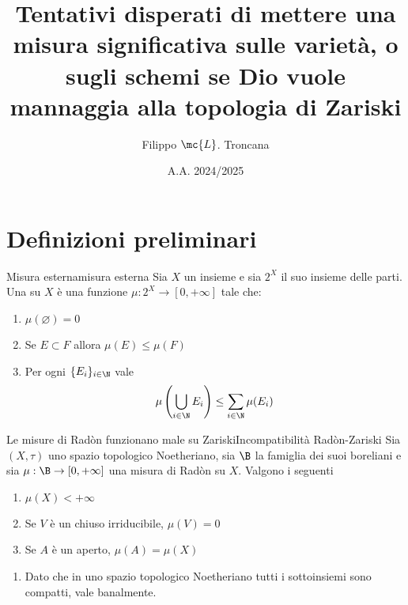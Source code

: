 \documentclass{article}
\title{Tentativi disperati di mettere una misura significativa sulle varietà, o sugli schemi se Dio vuole mannaggia alla topologia di Zariski}
\author{Filippo $\mc{L}$. Troncana}
\date{A.A. 2024/2025}
\begin{document}
\maketitle

\section{Definizioni preliminari}

\begin{definition}{Misura esterna}{misura esterna}
    Sia $X$ un insieme e sia $2^X$ il suo insieme delle parti. Una  su $X$ è una funzione $\mu : 2^X\to [0,+\infty]$ tale che:\begin{enumerate}
        \item $\mu(\varnothing) = 0$
        \item Se $E \subset F$ allora $\mu(E)\le \mu(F)$
        \item Per ogni $\{E_i\}_{i \in \N}$ vale
        \[ \mu\left( \bigcup_{i \in \N} E_i \right) \le \sum_{i \in \N} \mu(E_i) \]
    \end{enumerate}
\end{definition}

\begin{theorem}{Le misure di Radòn funzionano male su Zariski}{Incompatibilità Radòn-Zariski}
    Sia $(X,\tau)$ uno spazio topologico Noetheriano, sia $\B$ la famiglia dei suoi boreliani e sia $\mu : \B \to [0,+\infty]$ una misura di Radòn su $X$. Valgono i seguenti
    \begin{enumerate}
        \item $\mu(X) < +\infty$
        \item Se $V$ è un chiuso irriducibile, $\mu(V) = 0$
        \item Se $A$ è un aperto, $\mu(A) = \mu(X)$
    \end{enumerate}
    \proof 
    \begin{enumerate}
        \item Dato che in uno spazio topologico Noetheriano tutti i sottoinsiemi sono compatti, vale banalmente.
    \end{enumerate}
\end{theorem}
\end{document}
